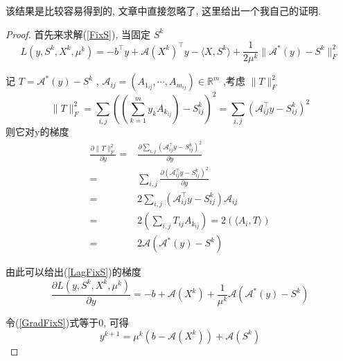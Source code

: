 \documentclass[a4paper, UTF8]{ctexart}				%
\numberwithin{equation}{section}				%
\begin{document}
			该结果是比较容易得到的, 文章中直接忽略了, 这里给出一个我自己的证明.

			\begin{proof}
				首先来求解(\ref{FixS}), 当固定 $S^k$
				\begin{equation}\label{LagFixS}
						L(y, S^k, X^k, \mu^k)
					=	-b^\top y + \mathcal{A}(X^k)^\top y - \langle{X, S^k}\rangle+ \frac{1}{2\mu^k} \lVert{\mathcal{A}^*(y) - S^k}\rVert^2_F
				\end{equation}

				记 $T = \mathcal{A}^*(y) - S^k$ , $\mathcal{A}_{ij} = (A_{1_{ij}}, \cdots, A_{m_{ij}}) \in \mathbb{R}^{m}$ ,考虑 $\lVert{T}\rVert^2_F$
				\[
						\lVert{T}\rVert^2_F
					=	\sum_{i, j}((\sum^m_{k = 1} y_k A_{k_{ij}}) - S^k_{ij})^2
					=	\sum_{i, j}(\mathcal{A}_{ij}^\top y - S^k_{ij})^2
				\]
				则它对y的梯度
				\begin{equation}
					\begin{aligned}
							\frac{\partial \lVert{T}\rVert^2_F}{\partial y}
						=	& \frac{\partial \sum_{i, j}(\mathcal{A}_{ij}^\top y - S^k_{ij})^2}{\partial y}\\
						=	& \sum_{i, j}\frac{\partial (\mathcal{A}_{ij}^\top y - S^k_{ij})^2}{\partial y} \\
						=	& 2\sum_{i, j}(\mathcal{A}_{ij}^\top y - S^k_{ij}) \mathcal{A}_{ij}\\
						=	& 2(\sum_{i, j}T_{ij} A_{k_{ij}})
						=	  2(\langle{A_i, T}\rangle)\\
						=	& 2\mathcal{A}(\mathcal{A}^*(y) - S^k)
					\end{aligned}
				\end{equation}

				\quad 由此可以给出(\ref{LagFixS})的梯度
				\begin{equation}\label{GradFixS}
						\frac{\partial L(y, S^k, X^k, \mu^k)}{\partial y}
					=	-b + \mathcal{A}(X^k) + \frac{1}{\mu^k} \mathcal{A}(\mathcal{A}^*(y) - S^k)
				\end{equation}

				\quad 令(\ref{GradFixS})式等于0, 可得
				\begin{equation}
					y^{k + 1} = \mu^k(b - \mathcal{A}(X^k)) + \mathcal{A}(S^k)
				\end{equation}


\end{proof}
\end{document}
